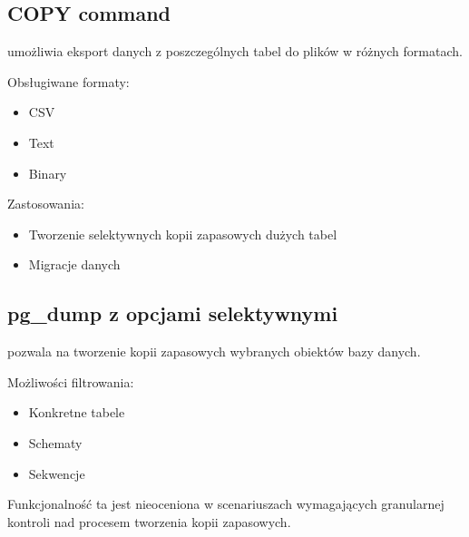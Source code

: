 \documentclass[a4paper,11pt,polish]{sphinxmanual}
\begin{document}
\subsection{COPY command}
\label{\detokenize{Kopie_zapasowe_i_odzyskiwanie_danych/kopie_zapasowe_i_odzyskiwanie_danych:copy-command}}
\sphinxAtStartPar
{} umożliwia eksport danych z poszczególnych tabel do plików w różnych formatach.

\sphinxAtStartPar
Obsługiwane formaty:
\begin{itemize}
\item {} 
\sphinxAtStartPar
CSV

\item {} 
\sphinxAtStartPar
Text

\item {} 
\sphinxAtStartPar
Binary

\end{itemize}

\sphinxAtStartPar
Zastosowania:
\begin{itemize}
\item {} 
\sphinxAtStartPar
Tworzenie selektywnych kopii zapasowych dużych tabel

\item {} 
\sphinxAtStartPar
Migracje danych

\end{itemize}


\subsection{pg\_dump z opcjami selektywnymi}
\label{\detokenize{Kopie_zapasowe_i_odzyskiwanie_danych/kopie_zapasowe_i_odzyskiwanie_danych:pg-dump-z-opcjami-selektywnymi}}
\sphinxAtStartPar
{} pozwala na tworzenie kopii zapasowych wybranych obiektów bazy danych.

\sphinxAtStartPar
Możliwości filtrowania:
\begin{itemize}
\item {} 
\sphinxAtStartPar
Konkretne tabele

\item {} 
\sphinxAtStartPar
Schematy

\item {} 
\sphinxAtStartPar
Sekwencje

\end{itemize}

\sphinxAtStartPar
Funkcjonalność ta jest nieoceniona w scenariuszach wymagających granularnej kontroli nad procesem tworzenia kopii zapasowych.
\end{document}
